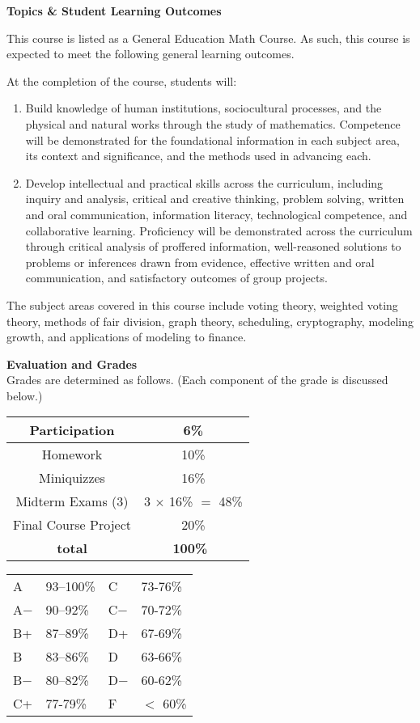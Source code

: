 \documentclass[11pt]{article}
\renewcommand{\emph}[1]{\textsf{\textbf{#1}}}
\newcommand{\localhead}[1]{\par\smallskip\textbf{#1} \smallskip\nobreak\\}%
\def\heading#1{\localhead{\large\emph{#1}}}
\begin{document}
\emph{\large{Topics \& Student Learning Outcomes}}

 This course is listed as a General Education Math Course. As such,
 this course is expected to meet the following general learning outcomes.

 At the completion of the course, students will:
 \begin{enumerate}
 \item Build knowledge of human institutions, sociocultural processes, and the physical and
   natural works through the study of mathematics. Competence will be demonstrated for
   the foundational information in each subject area, its context and significance, and the
   methods used in advancing each.
 \item Develop intellectual and practical skills across the curriculum, including inquiry and
   analysis, critical and creative thinking, problem solving, written and oral communication,
   information literacy, technological competence, and collaborative learning. Proficiency
   will be demonstrated across the curriculum through critical analysis of proffered
   information, well-reasoned solutions to problems or inferences drawn from evidence,
   effective written and oral communication, and satisfactory outcomes of group projects.
 \end{enumerate}

The subject areas covered in this course include voting theory, weighted voting theory, methods of fair division, graph theory, scheduling, cryptography, modeling growth, and applications of modeling to finance.

\strut


\heading{Evaluation and Grades}
Grades are determined as follows.  (Each component of the grade is discussed below.)
 
\begin{multicols}{2}
\begin{tabular}{|c|c|}
\hline
Participation & 6\%\\
\hline
Homework & 10\% \\
\hline
Miniquizzes & 16\% \\
\hline
Midterm Exams (3) & 3 $\times$ 16\% $=$ 48\% \\
\hline
Final Course Project & 20\% \\
\hline
{\bf total} & {\bf 100\%} \, \\
\hline
\end{tabular}
%
\hspace{1cm}
\begin{tabular}{llll}
A  & 93--100\%& C  & 73-76\%  \\
A$-$ & 90--92\% & C$-$ & 70-72\% \\
B+ & 87--89\% & D+ & 67-69\%  \\
B  & 83--86\% & D  & 63-66\%  \\
B$-$& 80--82\% & D$-$ & 60-62\%  \\
C+ & 77-79\% & F  & $<$ 60\%
\end{tabular}
\end{multicols}
\end{document}
